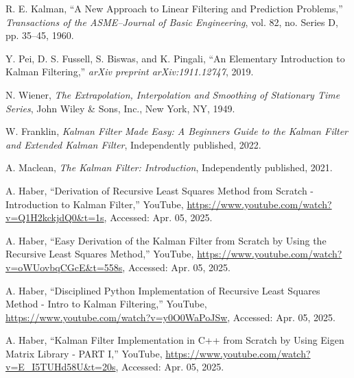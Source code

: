 \documentclass[12pt]{article}
\begin{document}
\newpage

\begin{thebibliography}{9}
R. E. Kalman, ``A New Approach to Linear Filtering and Prediction Problems,'' \textit{Transactions of the ASME–Journal of Basic Engineering}, vol. 82, no. Series D, pp. 35–45, 1960.

Y. Pei, D. S. Fussell, S. Biswas, and K. Pingali, ``An Elementary Introduction to Kalman Filtering,'' \textit{arXiv preprint arXiv:1911.12747}, 2019.

N. Wiener, \textit{The Extrapolation, Interpolation and Smoothing of Stationary Time Series}, John Wiley \& Sons, Inc., New York, NY, 1949.

W. Franklin, \textit{Kalman Filter Made Easy: A Beginners Guide to the Kalman Filter and Extended Kalman Filter}, Independently published, 2022.

A. Maclean, \textit{The Kalman Filter: Introduction}, Independently published, 2021.

A. Haber, ``Derivation of Recursive Least Squares Method from Scratch - Introduction to Kalman Filter,'' YouTube, \url{https://www.youtube.com/watch?v=Q1H2kckjdQ0&t=1s}, Accessed: Apr. 05, 2025.

A. Haber, ``Easy Derivation of the Kalman Filter from Scratch by Using the Recursive Least Squares Method,'' YouTube, \url{https://www.youtube.com/watch?v=oWUovbqCGcE&t=558s}, Accessed: Apr. 05, 2025.

A. Haber, ``Disciplined Python Implementation of Recursive Least Squares Method - Intro to Kalman Filtering,'' YouTube, \url{https://www.youtube.com/watch?v=y0O0WaPoJSw}, Accessed: Apr. 05, 2025.

A. Haber, ``Kalman Filter Implementation in C++ from Scratch by Using Eigen Matrix Library - PART I,'' YouTube, \url{https://www.youtube.com/watch?v=E_I5TUHd58U&t=20s}, Accessed: Apr. 05, 2025.
\end{thebibliography}
\end{document}
